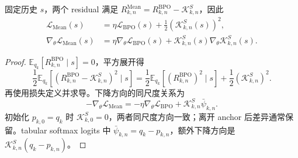 \begin{proposition}
\label{prop:ch2-mean-bpo-gap}
固定历史 $s$，两个 residual 满足 $R_{k,n}^{\mathrm{Mean}}=R_{k,n}^{\mathrm{BPO}}-\mathcal K_{k,n}^{S}$，因此
\begin{align}
\mathcal L_{\mathrm{Mean}}(s)&=\eta\mathcal L_{\mathrm{BPO}}(s)+\frac12(\mathcal K_{k,n}^{S}(s))^2,\\
\nabla_\theta\mathcal L_{\mathrm{Mean}}(s)&=\eta\nabla_\theta\mathcal L_{\mathrm{BPO}}(s)+\mathcal K_{k,n}^{S}(s)\nabla_\theta\mathcal K_{k,n}^{S}(s).
\label{eq:ch2-mean-bpo-gap}
\end{align}
\end{proposition}
\begin{proof}
$\mathbb E_{ q_k}[R_{k,n}^{\mathrm{BPO}}\mid s]=0$，平方展开得
\begin{equation*}
\frac12\mathbb E_{ q_k}[(R_{k,n}^{\mathrm{BPO}}-\mathcal K_{k,n}^{S})^2\mid s]
=\frac12\mathbb E_{ q_k}[(R_{k,n}^{\mathrm{BPO}})^2\mid s]+\frac12(\mathcal K_{k,n}^{S})^2.
\end{equation*}
再使用损失定义并求导。下降方向的同尺度关系为
\begin{equation*}
-\nabla_\theta\mathcal L_{\mathrm{Mean}}
=-\eta\nabla_\theta\mathcal L_{\mathrm{BPO}}+\mathcal K_{k,n}^{S}\bar\psi_{k,n}.
\end{equation*}
初始化 $ p_{k,0}= q_k$ 时 $\mathcal K_{k,0}^{S}=0$，两者同尺度方向一致；离开 anchor 后差异通常保留。tabular softmax logits 中 $\bar\psi_{k,n}= q_k- p_{k,n}$，额外下降方向是 $\mathcal K_{k,n}^{S}( q_k- p_{k,n})$。
\end{proof}

